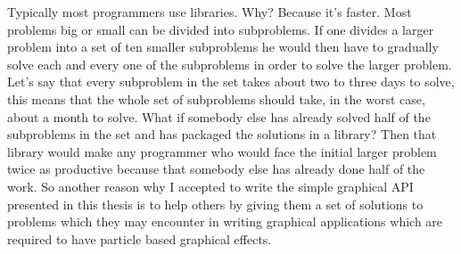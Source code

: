 Typically most programmers use libraries. Why? Because it's faster. Most problems big or small can be divided into subproblems. If one divides a larger problem into a set of ten smaller subproblems he would then have to gradually solve each and every one of the subproblems in order to solve the larger problem. Let's say that every subproblem in the set takes about two to three days to solve, this means that the whole set of subproblems should take, in the worst case, about a month to solve. What if somebody else has already solved half of the subproblems in the set and has packaged the solutions in a library? Then that library would make any programmer who would face the initial larger problem twice as productive because that somebody else has already done half of the work. So another reason why I accepted to write the simple graphical API presented in this thesis is to help others by giving them a set of solutions to problems which they may encounter in writing graphical applications which are required to have particle based graphical effects.